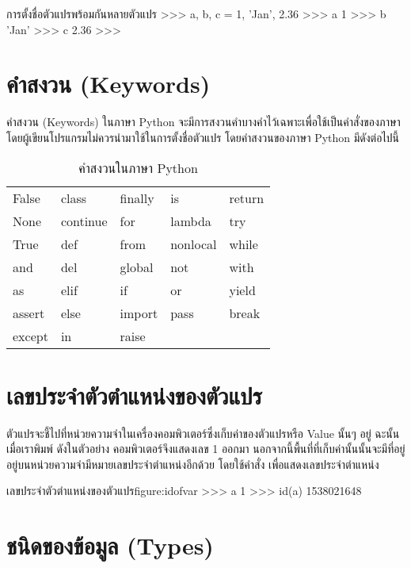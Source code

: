 \begin{codelist}{การตั้งชื่อตัวแปรพร้อมกันหลายตัวแปร}{}
>>> a, b, c = 1, 'Jan', 2.36
>>> a
1
>>> b
'Jan'
>>> c
2.36
>>> 
\end{codelist}


\section{คำสงวน (Keywords)}

คำสงวน (Keywords) ในภาษา Python จะมีการสงวนคำบางคำไว้เฉพาะเพื่อใช้เป็นคำสั่งของภาษา โดยผู้เขียนโปรแกรมไม่ควรนำมาใช้ในการตั้งชื่อตัวแปร โดยคำสงวนของภาษา Python มีดังต่อไปนี้ \cite{lutz2014}

\begin{table}[H]
\caption{คำสงวนในภาษา Python}
\centering
\begin{tabu}{l l l l l}
\rowfont{\ttfamily}
False & class & finally & is & return \\
\rowfont{\ttfamily}
None & continue & for & lambda & try \\
\rowfont{\ttfamily}
True & def & from & nonlocal & while \\
\rowfont{\ttfamily}
and & del & global & not & with \\
\rowfont{\ttfamily}
as & elif & if & or & yield \\
\rowfont{\ttfamily}
assert & else & import & pass & break \\
\rowfont{\ttfamily}
except & in & raise && \\
\end{tabu}
\end{table}


\section{เลขประจำตัวตำแหน่งของตัวแปร}
ตัวแปรจะชี้ไปที่หน่วยความจำในเครื่องคอมพิวเตอร์ซึ่งเก็บค่าของตัวแปรหรือ Value นั้นๆ อยู่ ฉะนั้นเมื่อเราพิมพ์  ดังในตัวอย่าง คอมพิวเตอร์จึงแสดงเลข 1 ออกมา นอกจากนี้พื้นที่ที่เก็บค่านั้นนั้นจะมีที่อยู่อยู่บนหน่วยความจำมีหมายเลขประจำตำแหน่งอีกด้วย โดยใช้คำสั่ง  เพื่อแสดงเลขประจำตำแหน่ง

\begin{codelist}{เลขประจำตัวตำแหน่งของตัวแปร}{figure:idofvar}
>>> a
1
>>> id(a)
1538021648
\end{codelist}

\section{ชนิดของข้อมูล (Types)}

